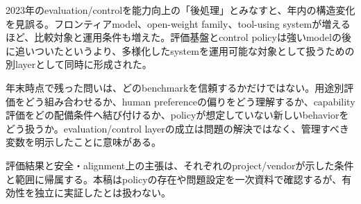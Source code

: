2023年のevaluation/controlを能力向上の「後処理」とみなすと、年内の構造変化を見誤る。フロンティアmodel、open-weight family、tool-using systemが増えるほど、比較対象と運用条件も増えた。評価基盤とcontrol policyは強いmodelの後に追いついたというより、多様化したsystemを運用可能な対象として扱うための別layerとして同時に形成された。\autocite{src-14f8acc117f1,src-1df7a91d31ec,src-25adcaa1c831,src-394ea6d17701,src-8f63dfa1697f,src-a1c8df89a3c9,src-b276b4af9d56,src-b2d10cbd609c,src-b6a5fdb87e9f}


年末時点で残った問いは、どのbenchmarkを信頼するかだけではない。用途別評価をどう組み合わせるか、human preferenceの偏りをどう理解するか、capability評価をどの配備条件へ結び付けるか、policyが想定していない新しいbehaviorをどう扱うか。evaluation/control layerの成立は問題の解決ではなく、管理すべき変数を明示したことに意味がある。\autocite{src-14f8acc117f1,src-1df7a91d31ec,src-25adcaa1c831,src-394ea6d17701,src-8f63dfa1697f,src-a1c8df89a3c9,src-b276b4af9d56,src-b2d10cbd609c,src-b6a5fdb87e9f}


\begin{claimboundary}
評価結果と安全・alignment上の主張は、それぞれのproject/vendorが示した条件と範囲に帰属する。本稿はpolicyの存在や問題設定を一次資料で確認するが、有効性を独立に実証したとは扱わない。\autocite{src-25adcaa1c831,src-a1c8df89a3c9,src-b276b4af9d56,src-b6a5fdb87e9f}
\end{claimboundary}
